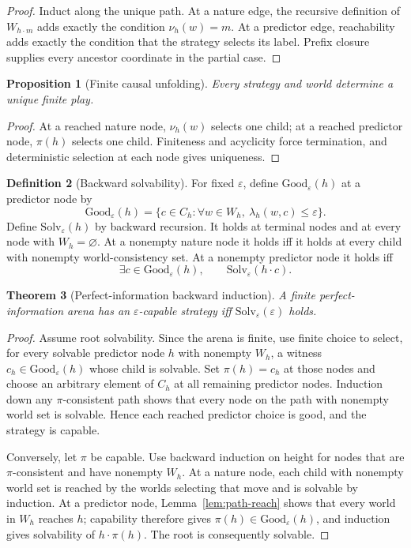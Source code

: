 \documentclass[11pt]{article}
\theoremstyle{plain}
\newtheorem{theorem}{Theorem}[section]
\newtheorem{proposition}[theorem]{Proposition}
\theoremstyle{definition}
\newtheorem{definition}[theorem]{Definition}
\theoremstyle{remark}
\newcommand{\eps}{\varepsilon}
\begin{document}
\begin{proof}
Induct along the unique path. At a nature edge, the recursive definition of
$W_{h\cdot m}$ adds exactly the condition $\nu_h(w)=m$. At a predictor edge,
reachability adds exactly the condition that the strategy selects its label.
Prefix closure supplies every ancestor coordinate in the partial case.
\end{proof}

\begin{proposition}[Finite causal unfolding]\label{prop:finite-unfolding}
Every strategy and world determine a unique finite play.
\end{proposition}

\begin{proof}
At a reached nature node, $\nu_h(w)$ selects one child; at a reached predictor
node, $\pi(h)$ selects one child. Finiteness and acyclicity force termination,
and deterministic selection at each node gives uniqueness.
\end{proof}

\begin{definition}[Backward solvability]\label{def:solv}
For fixed $\eps$, define $\mathrm{Good}_\eps(h)$ at a predictor node by
\[
\mathrm{Good}_\eps(h)=
\{c\in C_h:\forall w\in W_h,\ \lambda_h(w,c)\le\eps\}.
\]
Define $\mathrm{Solv}_\eps(h)$ by backward recursion. It holds at terminal nodes
and at every node with $W_h=\varnothing$. At a nonempty nature node it holds iff
it holds at every child with nonempty world-consistency set. At a nonempty
predictor node it holds iff
\[
\exists c\in\mathrm{Good}_\eps(h),
\qquad
\mathrm{Solv}_\eps(h\cdot c).
\]
\end{definition}

\begin{theorem}[Perfect-information backward induction]\label{thm:backward}
A finite perfect-information arena has an $\eps$-capable strategy iff
$\mathrm{Solv}_\eps(\varepsilon)$ holds.
\end{theorem}

\begin{proof}
Assume root solvability. Since the arena is finite, use finite choice to select,
for every solvable predictor node $h$ with nonempty $W_h$, a witness
$c_h\in\mathrm{Good}_\eps(h)$ whose child is solvable. Set $\pi(h)=c_h$ at
those nodes and choose an arbitrary element of $C_h$ at all remaining predictor
nodes. Induction down any $\pi$-consistent path shows that every
node on the path with nonempty world set is solvable. Hence each reached
predictor choice is good, and the strategy is capable.

Conversely, let $\pi$ be capable. Use backward induction on height for nodes that
are $\pi$-consistent and have nonempty $W_h$. At a nature node, each child with
nonempty world set is reached by the worlds selecting that move and is solvable
by induction. At a predictor node, Lemma~\ref{lem:path-reach} shows that every
world in $W_h$ reaches $h$; capability therefore gives
$\pi(h)\in\mathrm{Good}_\eps(h)$, and induction gives solvability of
$h\cdot\pi(h)$. The root is consequently solvable.
\end{proof}
\end{document}
